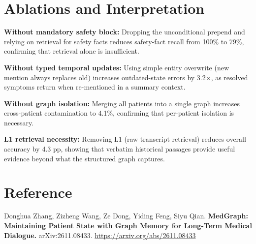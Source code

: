 \documentclass[10pt,twocolumn]{article}
\begin{document}
\section{Ablations and Interpretation}

\textbf{Without mandatory safety block:} Dropping the unconditional
prepend and relying on retrieval for safety facts reduces safety-fact
recall from 100\% to 79\%, confirming that retrieval alone is
insufficient.

\textbf{Without typed temporal updates:} Using simple entity overwrite
(new mention always replaces old) increases outdated-state errors by
3.2$\times$, as resolved symptoms return when re-mentioned in a summary
context.

\textbf{Without graph isolation:} Merging all patients into a single
graph increases cross-patient contamination to 4.1\%, confirming that
per-patient isolation is necessary.

\textbf{L1 retrieval necessity:} Removing L1 (raw transcript retrieval)
reduces overall accuracy by 4.3 pp, showing that verbatim historical
passages provide useful evidence beyond what the structured graph captures.

\section*{Reference}

Donghua Zhang, Zizheng Wang, Ze Dong, Yiding Feng, Siyu Qian.
\textbf{MedGraph: Maintaining Patient State with Graph Memory for
Long-Term Medical Dialogue.}
arXiv:2611.08433.
\url{https://arxiv.org/abs/2611.08433}
\end{document}
